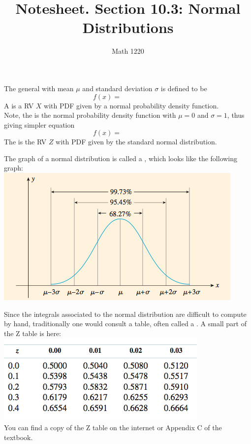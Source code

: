 \documentclass[12pt, a4paper]{article}
\author{Math 1220}
\title{Notesheet. Section 10.3: Normal Distributions}
\date{}
\begin{document}
\maketitle
\nameline
\begin{defi}
  The general  with mean
  \(\mu\) and standard deviation \(\sigma\) is defined to be \[
    f(x) = \hspace{1in}
  \]
  A  is a RV \(X\) with PDF given by a normal
  probability density function. \\
  Note, the  is the normal
  probability density function with \(\mu = 0\)
  and \(\sigma=1\), thus giving simpler equation \[
    f(x) = \hspace{1in}
  \]
  The  is the RV \(Z\) with PDF given by
  the standard normal distribution.
\end{defi}
\vspace{-0.3in}
\begin{thrm}
  The graph of a normal distribution is called a ,
  which looks like the following graph: \\
  \includegraphics[scale=0.7]{images/normal-curve}
\end{thrm}
\vspace{-1in}
\begin{rmk}
  Since the integrals associated to the normal distribution are
  difficult to compute by hand, traditionally one would consult a
  table, often called a . A small part of the Z table is
  here: \\
  \includegraphics[scale=0.6]{images/z-table}\\
  You can find a copy of the Z table on the internet or Appendix C of
  the textbook.
\end{rmk}
\end{document}
